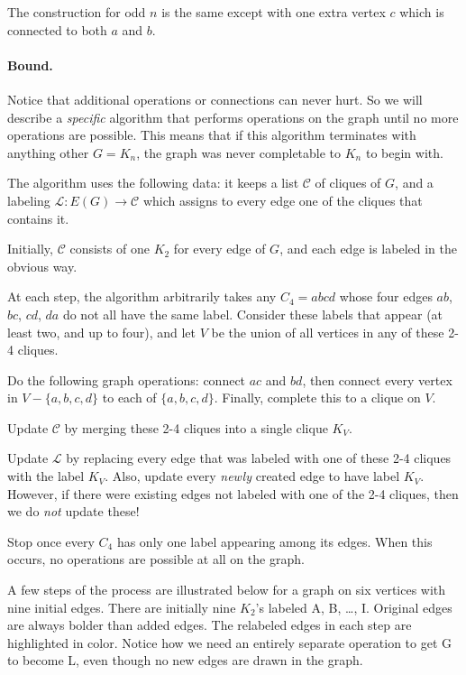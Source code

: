 \documentclass[11pt]{scrartcl}
\begin{document}
The construction for odd $n$ is the same except with one extra vertex $c$
which is connected to both $a$ and $b$.

\paragraph{Bound.}
Notice that additional operations or connections can never hurt.
So we will describe a \emph{specific} algorithm that performs operations
on the graph until no more operations are possible.
This means that if this algorithm terminates with anything other $G = K_n$,
the graph was never completable to $K_n$ to begin with.

The algorithm uses the following data:
it keeps a list $\mathcal C$ of cliques of $G$,
and a labeling $\mathcal{L} \colon E(G) \to \mathcal C$ which assigns to every
edge one of the cliques that contains it.
\begin{itemize}
  \ii Initially, $\mathcal C$ consists of one $K_2$ for every edge of $G$,
  and each edge is labeled in the obvious way.

  \ii At each step, the algorithm arbitrarily takes any $C_4 = abcd$
  whose four edges $ab$, $bc$, $cd$, $da$ do not all have the same label.
  Consider these labels that appear (at least two, and up to four),
  and let $V$ be the union of all vertices in any of these 2-4 cliques.

  \ii Do the following graph operations:
  connect $ac$ and $bd$, then connect every vertex in $V - \{a,b,c,d\}$
  to each of $\{a,b,c,d\}$.
  Finally, complete this to a clique on $V$.

  \ii Update $\mathcal C$ by merging these 2-4 cliques into a single clique $K_V$.

  \ii Update $\mathcal{L}$ by replacing every edge
  that was labeled with one of these 2-4 cliques with the label $K_V$.
  Also, update every \emph{newly} created edge to have label $K_V$.
  However, if there were existing edges
  not labeled with one of the 2-4 cliques, then we do \emph{not} update these!

  \ii Stop once every $C_4$ has only one label appearing among its edges.
  When this occurs, no operations are possible at all on the graph.
\end{itemize}
A few steps of the process are illustrated below for a graph on six vertices
with nine initial edges.
There are initially nine $K_2$'s labeled A, B, \dots, I.
Original edges are always bolder than added edges.
The relabeled edges in each step are highlighted in color.
Notice how we need an entirely separate operation to get G to become L,
even though no new edges are drawn in the graph.
\end{document}
